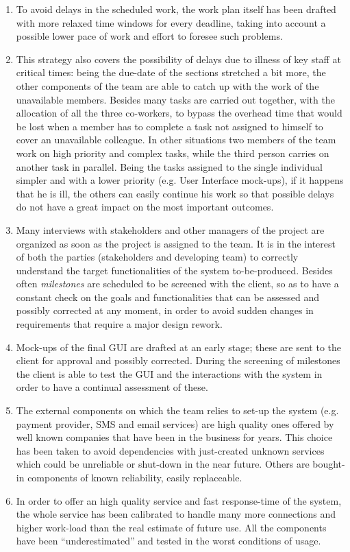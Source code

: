 \documentclass[a4paper,11pt]{report} %
\begin{document}
		\begin{enumerate}
			\item To avoid delays in the scheduled work, the work plan itself has been drafted with more relaxed time windows for every deadline, taking into account a possible lower pace of work and effort to foresee such problems.
			\item This strategy also covers the possibility of delays due to illness of key staff at critical times: being the due-date of the sections stretched a bit more, the other components of the team are able to catch up with the work of the unavailable members. Besides many tasks are carried out together, with the allocation of all the three co-workers, to bypass the overhead time that would be lost when a member has to complete a task not assigned to himself to cover an unavailable colleague. In other situations two members of the team work on high priority and complex tasks, while the third person carries on another task in parallel. Being the tasks assigned to the single individual simpler and with a lower priority (e.g. User Interface mock-ups), if it happens that he is ill, the others can easily continue his work so that possible delays do not have a great impact on the most important outcomes.
			\item Many interviews with stakeholders and other managers of the project are organized as soon as the project is assigned to the team. It is in the interest of both the parties (stakeholders and developing team) to correctly understand the target functionalities of the system to-be-produced. Besides often \textit{milestones} are scheduled to be screened with the client, so as to have a constant check on the goals and functionalities that can be assessed and possibly corrected at any moment, in order to avoid sudden changes in requirements that require a major design rework.
			\item Mock-ups of the final GUI are drafted at an early stage; these are sent to the client for approval and possibly corrected. During the screening of milestones the client is able to test the GUI and the interactions with the system in order to have a continual assessment of these.
			\item The external components on which the team relies to set-up the system (e.g. payment provider, SMS and email services) are high quality ones offered by well known companies that have been in the business for years. This choice has been taken to avoid dependencies with just-created unknown services which could be unreliable or shut-down in the near future. Others are bought-in components of known reliability, easily replaceable.
			\item In order to offer an high quality service and fast response-time of the system, the whole service has been calibrated to handle many more connections and higher work-load than the real estimate of future use. All the components have been ``underestimated'' and tested in the worst conditions of usage.
		\end{enumerate}		
\end{document}
